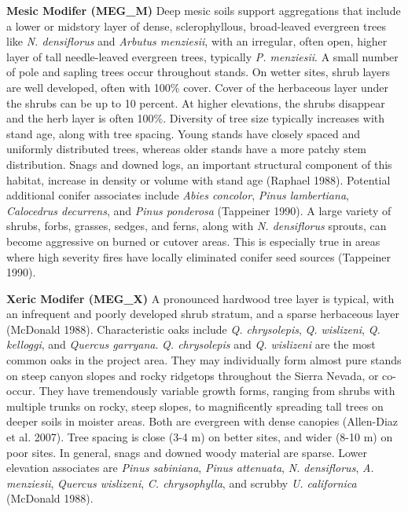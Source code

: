 \begin{adjustwidth}{2cm}{}
\textbf{Mesic Modifer (MEG\_M)}
Deep mesic soils support aggregations that include a lower or midstory layer of dense, sclerophyllous, broad-leaved evergreen trees like \emph{N. densiflorus} and \emph{Arbutus menziesii}, with an irregular, often open, higher layer of tall needle-leaved evergreen trees, typically \emph{P. menziesii}. A small number of pole and sapling trees occur throughout stands. On wetter sites, shrub layers are well developed, often with 100\% cover. Cover of the herbaceous layer under the shrubs can be up to 10 percent. At higher elevations, the shrubs disappear and the herb layer is often 100\%. Diversity of tree size typically increases with stand age, along with tree spacing. Young stands have closely spaced and uniformly distributed trees, whereas older stands have a more patchy stem distribution. Snags and downed logs, an important structural component of this habitat, increase in density or volume with stand age (Raphael 1988). Potential additional conifer associates include \emph{Abies concolor}, \emph{Pinus lambertiana}, \emph{Calocedrus decurrens}, and \emph{Pinus ponderosa} (Tappeiner 1990). A large variety of shrubs, forbs, grasses, sedges, and ferns, along with \emph{N. densiflorus} sprouts, can become aggressive on burned or cutover areas. This is especially true in areas where high severity fires have locally eliminated conifer seed sources (Tappeiner 1990).

\medskip
\noindent \textbf{Xeric Modifer (MEG\_X)}
A pronounced hardwood tree layer is typical, with an infrequent and poorly developed shrub stratum, and a sparse herbaceous layer (McDonald 1988). Characteristic oaks include \emph{Q. chrysolepis}, \emph{Q. wislizeni}, \emph{Q. kelloggi}, and \emph{Quercus garryana}. \emph{ Q. chrysolepis} and \emph{Q. wislizeni} are the most common oaks in the project area. They may individually form almost pure stands on steep canyon slopes and rocky ridgetops throughout the Sierra Nevada, or co-occur. They have tremendously variable growth forms, ranging from shrubs with multiple trunks on rocky, steep slopes, to magnificently spreading tall trees on deeper soils in moister areas. Both are evergreen with dense canopies (Allen-Diaz et al. 2007). Tree spacing is close (3-4 m) on better sites, and wider (8-10 m) on poor sites. In general, snags and downed woody material are sparse. Lower elevation associates are \emph{Pinus sabiniana}, \emph{Pinus attenuata}, \emph{N. densiflorus}, \emph{A. menziesii}, \emph{Quercus wislizeni}, \emph{C. chrysophylla}, and scrubby \emph{U. californica} (McDonald 1988).


\end{adjustwidth}
